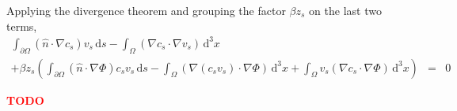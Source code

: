 Applying the divergence theorem and grouping the factor $\beta z_s$ on the last two terms,
\begin{equation}
\begin{aligned}
\int_{\partial\Omega} \left( \hat{n} \cdot \nabla c_s \right) v_s \,\mathrm{d}s
- \int_\Omega \left( \nabla c_s \cdot \nabla v_s \right) \,\mathrm{d}^3x \\
+ \beta z_s \left( \int_{\partial\Omega} \left( \hat{n} \cdot \nabla \Phi \right) c_s v_s \,\mathrm{d}s
- \int_\Omega \left( \nabla \left( c_s v_s \right)  \cdot \nabla \Phi \right) \,\mathrm{d}^3x
+ \int_\Omega  v_s \left( \nabla c_s \cdot \nabla \Phi \right) \,\mathrm{d}^3x \right)
& = & 0
\end{aligned}
\end{equation}



\textcolor{red}{\textbf{TODO}}
